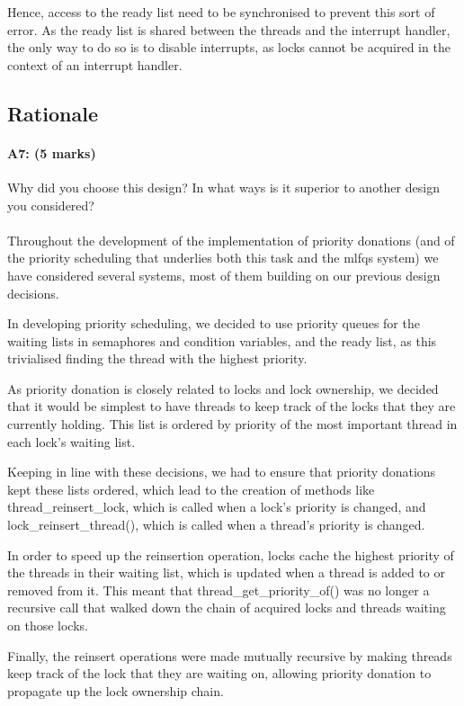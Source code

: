 Hence, access to the ready list need to be synchronised to prevent this sort of error. As the ready list is shared between the threads and the interrupt handler, the only way to do so is to disable interrupts, as locks cannot be acquired in the context of an interrupt handler.


\subsection{Rationale}
\paragraph{A7: (5 marks)}
Why did you choose this design?  In what ways is it superior to another design you considered?
\\
\\
Throughout the development of the implementation of priority donations (and of the priority scheduling that underlies both this task and the mlfqs system) we have considered several systems, most of them building on our previous design decisions.

In developing priority scheduling, we decided to use priority queues for the waiting lists in semaphores and condition variables, and the ready list, as this trivialised finding the thread with the highest priority.

As priority donation is closely related to locks and lock ownership, we decided that it would be simplest to have threads to keep track of the locks that they are currently holding. This list is ordered by priority of the most important thread in each lock's waiting list.

Keeping in line with these decisions, we had to ensure that priority donations kept these lists ordered, which lead to the creation of methods like thread_reinsert_lock, which is called when a lock's priority is changed, and lock_reinsert_thread(), which is called when a thread's priority is changed.

In order to speed up the reinsertion operation, locks cache the highest priority of the threads in their waiting list, which is updated when a thread is added to or removed from it. This meant that thread_get_priority_of() was no longer a recursive call that walked down the chain of acquired locks and threads waiting on those locks.

Finally, the reinsert operations were made mutually recursive by making threads keep track of the lock that they are waiting on, allowing priority donation to propagate up the lock ownership chain.

